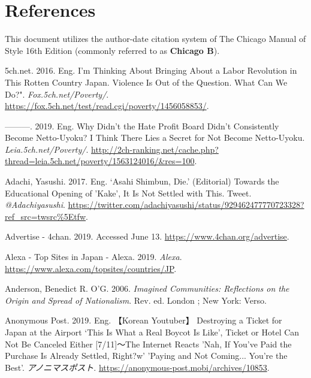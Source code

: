 \documentclass[10pt,british,A4paper,,openany]{memoir}
\begin{document}
\newpage

\begingroup
{}

\chapter*{References}

\setlength{\parindent}{-0.2in} \setlength{\leftskip}{0.2in}
\setlength{\parskip}{0em} \noindent

This document utilizes the author-date citation system of The Chicago
Manual of Style 16th Edition (commonly referred to as \textbf{Chicago
B}).

\vspace{4mm} \setlength{\parskip}{0em} \footnotesize

\hypertarget{refs}{}
\hypertarget{ref-5ch.net_eng._2016}{}
5ch.net. 2016. Eng. I'm Thinking About Bringing About a Labor Revolution
in This Rotten Country Japan. Violence Is Out of the Question. What Can
We Do?". \emph{Fox.5ch.net/Poverty/}.
\url{https://fox.5ch.net/test/read.cgi/poverty/1456058853/}.

\hypertarget{ref-5ch.net_eng._2019}{}
---------. 2019. Eng. Why Didn't the Hate Profit Board Didn't
Consistently Become Netto-Uyoku? I Think There Lies a Secret for Not
Become Netto-Uyoku. \emph{Leia.5ch.net/Poverty/}.
\url{http://2ch-ranking.net/cache.php?thread=leia.5ch.net/poverty/1563124016/\&res=100}.

\hypertarget{ref-adachi_eng._2017}{}
Adachi, Yasushi. 2017. Eng. `Asahi Shimbun, Die.' (Editorial) Towards
the Educational Opening of 'Kake', It Is Not Settled with This. Tweet.
\emph{@Adachiyasushi}.
\url{https://twitter.com/adachiyasushi/status/929462477770723328?ref_src=twsrc\%5Etfw}.

\hypertarget{ref-noauthor_advertise_nodate}{}
Advertise - 4chan. 2019. Accessed June 13.
\url{https://www.4chan.org/advertise}.

\hypertarget{ref-noauthor_alexa_2019}{}
Alexa - Top Sites in Japan - Alexa. 2019. \emph{Alexa}.
\url{https://www.alexa.com/topsites/countries/JP}.

\hypertarget{ref-anderson_imagined_2006}{}
Anderson, Benedict R. O'G. 2006. \emph{Imagined Communities: Reflections
on the Origin and Spread of Nationalism}. Rev. ed. London ; New York:
Verso.

\hypertarget{ref-anonymous_post_eng._2019}{}
Anonymous Post. 2019. Eng. 【Korean Youtuber】 Destroying a Ticket for
Japan at the Airport `This Is What a Real Boycot Is Like', Ticket or
Hotel Can Not Be Canceled Either {[}7/11{]}～The Internet Reacts 'Nah,
If You've Paid the Purchase Is Already Settled, Right?w' 'Paying and Not
Coming... You're the Best'. \emph{アノニマスポスト}.
\url{https://anonymous-post.mobi/archives/10853}.
\end{document}
